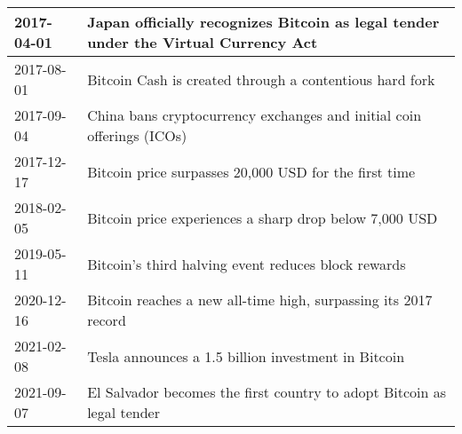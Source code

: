 \begin{table}[h]
\begin{tabular}{|l|p{10cm}|}
    \hline
    2017-04-01 & Japan officially recognizes Bitcoin as legal tender under the Virtual Currency Act \\
    \hline
    2017-08-01 & Bitcoin Cash is created through a contentious hard fork \\
    \hline
    2017-09-04 & China bans cryptocurrency exchanges and initial coin offerings (ICOs) \\
    \hline
    2017-12-17 & Bitcoin price surpasses 20,000 USD for the first time \\
    \hline
    2018-02-05 & Bitcoin price experiences a sharp drop below 7,000 USD \\
    \hline
    2019-05-11 & Bitcoin's third halving event reduces block rewards \\
    \hline
    2020-12-16 & Bitcoin reaches a new all-time high, surpassing its 2017 record \\
    \hline
    2021-02-08 & Tesla announces a 1.5 billion investment in Bitcoin \\
    \hline
    2021-09-07 & El Salvador becomes the first country to adopt Bitcoin as legal tender \\
    \hline
    \end{tabular}
    \end{table}
    



